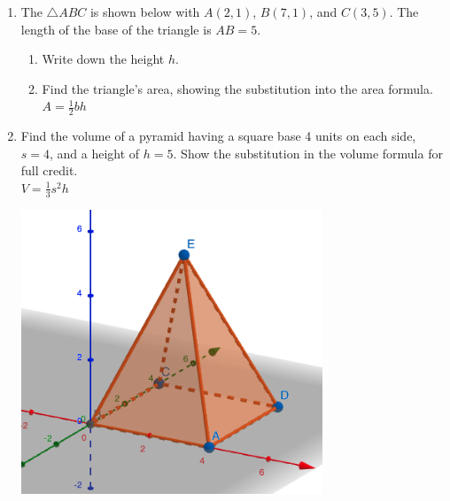 \begin{enumerate}
\item The $\triangle ABC$ is shown below with $A(2,1)$, $B(7,1)$, and $C(3,5)$. The length of the base of the triangle is $AB=5$.
  \begin{multicols}{2}
    \begin{enumerate}
      \item Write down the height $h$.
      \item Find the triangle's area, showing the substitution into the area formula.\\[0.25cm]
      $A=\frac{1}{2}bh$ \vspace{2cm}
      \end{enumerate}
      \begin{flushright}
      \end{flushright}
  \end{multicols}

\item Find the volume of a pyramid having a square base 4 units on each side, $s=4$, and a height of $h=5$. Show the substitution in the volume formula for full credit. \\[0.5cm]
$\displaystyle V = \frac{1}{3} s^2 h$
  \begin{flushright}
    \includegraphics[width=9cm]{../graphics/04pyramid.png}
  \end{flushright}


\end{enumerate}
